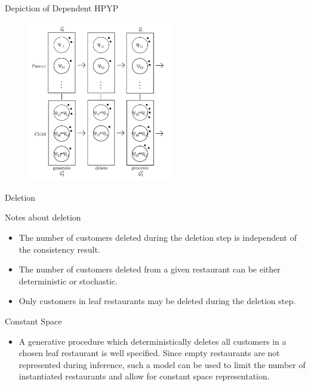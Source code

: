 \documentclass{beamer}
\begin{document}
\begin{frame}[t] {Depiction of Dependent HPYP}
	\begin{figure}[t]
		\begin{center}
			\includegraphics[height = 7cm]{../figs/figure2.pdf}
		\end{center}
	\end{figure}
\end{frame}

\begin{frame}[t]{Deletion}
	\begin{block}{Notes about deletion}
		\begin{itemize}
			\item The number of customers deleted during the deletion step is independent of the consistency result.
			\item The number of customers deleted from a given restaurant can be either deterministic or stochastic.
			\item Only customers in leaf restaurants may be deleted during the deletion step.
		\end{itemize}
	\end{block}
	
	\begin{block}{Constant Space}
		\begin{itemize}
			\item A generative procedure which deterministically deletes all customers in a chosen leaf restaurant is well specified.  Since empty restaurants are not represented during inference, such a model can be used to limit the number of instantiated restaurants and allow for constant space representation.
			\end{itemize}
	\end{block}
\end{frame}

\end{document}
